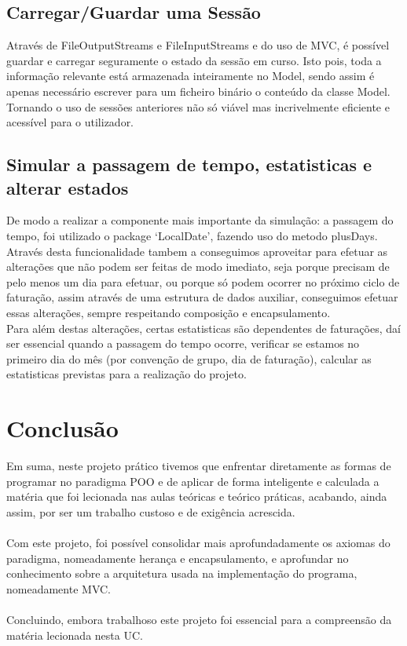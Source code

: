 \documentclass[10pt, a4paper]{article}
\begin{document}
\subsection{Carregar/Guardar uma Sessão}
        Através de FileOutputStreams e FileInputStreams e do uso de MVC, é possível guardar e carregar seguramente o estado da sessão em curso.
        Isto pois, toda a informação relevante está armazenada inteiramente no Model, sendo assim é apenas necessário escrever para um ficheiro binário o
        conteúdo da classe Model. Tornando o uso de sessões anteriores não só viável mas incrivelmente eficiente e acessível para o utilizador.
\subsection{Simular a passagem de tempo, estatisticas e alterar estados}
        De modo a realizar a componente mais importante da simulação: a passagem do tempo,
        foi utilizado o package `LocalDate', fazendo uso do metodo plusDays.
        \\ Através desta funcionalidade tambem a conseguimos aproveitar para efetuar as alterações que não podem ser feitas de modo imediato,
        seja porque precisam de pelo menos um dia para efetuar, ou porque só podem ocorrer no próximo ciclo de faturação, assim através de
        uma estrutura de dados auxiliar, conseguimos efetuar essas alterações, sempre respeitando composição e encapsulamento.
        \\ Para além destas alterações, certas estatisticas são dependentes de faturações, daí ser essencial quando a passagem do tempo ocorre,
        verificar se estamos no primeiro dia do mês (por convenção de grupo, dia de faturação), calcular as estatisticas previstas para a realização do projeto.

\newpage
\section{Conclusão}
        Em suma, neste projeto prático tivemos que enfrentar diretamente as formas de programar no paradigma POO e de aplicar
        de forma inteligente e calculada a matéria que foi lecionada nas aulas teóricas e teórico práticas, acabando, ainda assim, por ser um trabalho custoso
        e de exigência acrescida. \\ \\
        Com este projeto, foi possível consolidar mais aprofundadamente os axiomas do paradigma, nomeadamente herança e encapsulamento, e aprofundar no
        conhecimento sobre a arquitetura usada na implementação do programa, nomeadamente MVC.\@ \\ \\
        Concluindo, embora trabalhoso este projeto foi essencial para a compreensão da matéria lecionada nesta UC.\@
\end{document}
